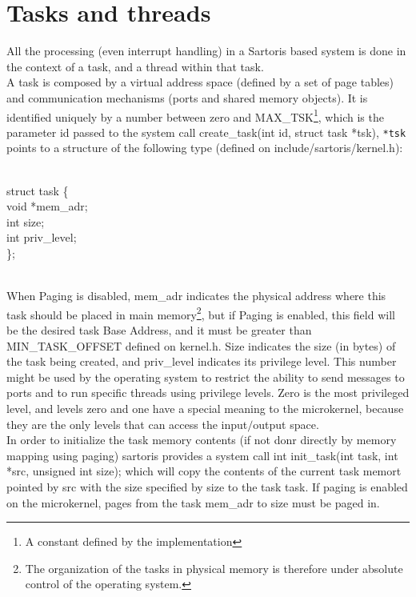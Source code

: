 \documentclass[11pt, letterpaper, twoside, english]{book}
\begin{document}
\section{Tasks and threads}
All the processing (even interrupt handling) in a Sartoris based system is done in the context of a task, and a thread within that task. \\
A task is composed by a virtual address space (defined by a set of page tables) and communication mechanisms (ports and shared memory objects). It is identified uniquely by a number between zero and \textsf{MAX\_TSK}\footnote{A constant defined by the implementation}, which is the parameter \textsf{id} passed to the system call \textsf{create\_task(int id, struct task *tsk)}, \verb|*tsk| points to a structure of the following type (defined on \textsf{include/sartoris/kernel.h}): \\
\\
\begin{sf} \noindent struct task \{ \\
\indent  void *mem\_adr; \\
\indent  int size; \\
\indent  int priv\_level; \\
\}; \\
\end{sf}
\\
\noindent 
When Paging is disabled, \textsf{mem\_adr} indicates the physical address where this task should be placed in main memory\footnote{The organization of the tasks in physical memory is therefore under absolute control of the operating system.}, but if Paging is enabled, this field will be the desired task Base Address, and it must be greater than \textsf{MIN\_TASK\_OFFSET} defined on \textsf{kernel.h}.
\textsf{Size} indicates the size (in bytes) of the task being created, and \textsf{priv\_level} indicates its privilege level. This number might be used by the operating system to restrict the ability to send messages to ports and to run specific threads using privilege levels. Zero is the most privileged level, and levels zero and one have a special meaning to the microkernel, because they are the only levels that can access the input$/$output space.\\

In order to initialize the task memory contents (if not donr directly by memory mapping using paging) sartoris provides a system call \textsf{int init\_task(int task, int *src, unsigned int size);} which will copy the contents of the current task memort pointed by \textsf{src} with the size specified by \textsf{size} to the task \textsf{task}. If paging is enabled on the microkernel, pages from the task \textsf{mem\_adr} to \textsf{size} must be paged in.\\
\end{document}
